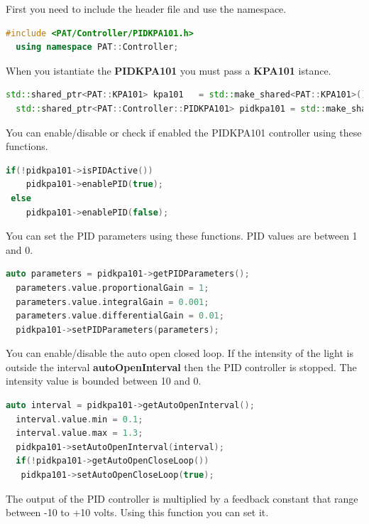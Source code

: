 First you need to include the header file and use the namespace.

\begin{lstlisting}[language=c++, gobble=2]
  #include <PAT/Controller/PIDKPA101.h>
  using namespace PAT::Controller;
\end{lstlisting}

When you istantiate the \textbf{PIDKPA101} you must pass a
\textbf{KPA101} istance.

\begin{lstlisting}[language=c++, gobble=2]
  std::shared_ptr<PAT::KPA101> kpa101   = std::make_shared<PAT::KPA101>();
  std::shared_ptr<PAT::Controller::PIDKPA101> pidkpa101 = std::make_shared<PAT::Controller::PIDKPA101>(kpa101);
\end{lstlisting}


You can enable/disable or check if enabled the PIDKPA101 controller
using these functions.

\begin{lstlisting}[language=c++, gobble=2]
  if(!pidkpa101->isPIDActive())
    pidkpa101->enablePID(true);
 else
    pidkpa101->enablePID(false); 
\end{lstlisting}


You can set the PID parameters using these functions. PID values are
between 1 and 0.

\begin{lstlisting}[language=c++, gobble=2]
  auto parameters = pidkpa101->getPIDParameters();
  parameters.value.proportionalGain = 1;
  parameters.value.integralGain = 0.001;
  parameters.value.differentialGain = 0.01;
  pidkpa101->setPIDParameters(parameters);
\end{lstlisting}


You can enable/disable the auto open closed loop. If the intensity of
the light is outside the interval \textbf{autoOpenInterval} then the PID
controller is stopped. The intensity value is bounded between 10 and 0.

\begin{lstlisting}[language=c++, gobble=2]
  auto interval = pidkpa101->getAutoOpenInterval();
  interval.value.min = 0.1;
  interval.value.max = 1.3;
  pidkpa101->setAutoOpenInterval(interval);
  if(!pidkpa101->getAutoOpenCloseLoop())
   pidkpa101->setAutoOpenCloseLoop(true);
\end{lstlisting}

The output of the PID controller is multiplied by a feedback constant
that range between -10 to +10 volts. Using this function you can set
it.

